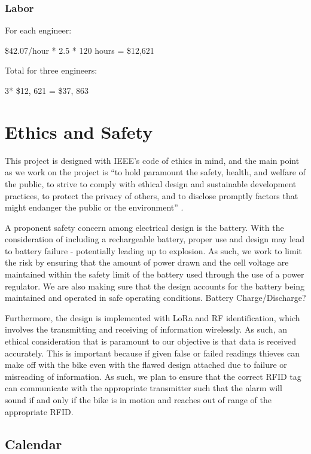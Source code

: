 \documentclass{article}
\begin{document}
\subsubsection{Labor}

For each engineer: 

\$42.07/hour * 2.5 * 120 hours = \$12,621 

Total for three engineers:

3* \$12, 621 = \$37, 863

\section{Ethics and Safety}
This project is designed with IEEE’s code of ethics in mind, and the main point as we work on the project is “to hold paramount the safety, health, and welfare of the public, to strive to comply with ethical design and sustainable development practices, to protect the privacy of others, and to disclose promptly factors that might endanger the public or the environment” \cite{ethics}.

A proponent safety concern among electrical design is the battery. With the consideration of including a rechargeable battery, proper use and design may lead to battery failure - potentially leading up to explosion. As such, we work to limit the risk by ensuring that the amount of power drawn and the cell voltage are maintained within the safety limit of the battery used through the use of a power regulator. We are also making sure that the design accounts for the battery being maintained and operated in safe operating conditions.
Battery Charge/Discharge?

Furthermore, the design is implemented with LoRa and RF identification, which involves the transmitting and receiving of information wirelessly. As such, an ethical consideration that is paramount to our objective is that data is received accurately. This is important because if given false or failed readings thieves can make off with the bike even with the flawed design attached due to failure or misreading of information. As such, we plan to ensure that the correct RFID tag can communicate with the appropriate transmitter such that the alarm will sound if and only if the bike is in motion and reaches out of range of the appropriate RFID. 

\subsection{Calendar}
\end{document}
